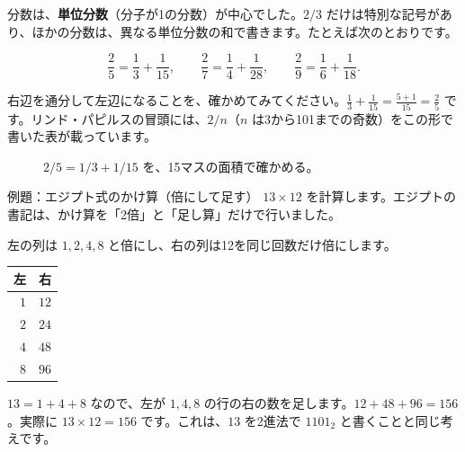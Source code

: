 \documentclass[a4paper,11pt,openany]{ltjsbook}
\begin{document}
分数は、\textbf{単位分数}（分子が1の分数）が中心でした。$2/3$ だけは特別な記号があり、ほかの分数は、異なる単位分数の和で書きます。たとえば次のとおりです。

\[
\frac{2}{5}=\frac13+\frac1{15},\qquad \frac27=\frac14+\frac1{28},\qquad \frac29=\frac16+\frac1{18}.
\]

右辺を通分して左辺になることを、確かめてみてください。$\tfrac13+\tfrac1{15}=\tfrac{5+1}{15}=\tfrac{2}{5}$ です。リンド・パピルスの冒頭には、$2/n$（$n$ は3から101までの奇数）をこの形で書いた表が載っています。

\begin{figure}[htbp]
\centering
{}
\caption{$2/5=1/3+1/15$ を、15マスの面積で確かめる。}
\end{figure}

\begin{examplebox}{例題：エジプト式のかけ算（倍にして足す）}
$13\times 12$ を計算します。エジプトの書記は、かけ算を「2倍」と「足し算」だけで行いました。

左の列は $1,2,4,8$ と倍にし、右の列は12を同じ回数だけ倍にします。

\begin{center}
\begin{tabular}{rr}
\toprule
左 & 右\\
\midrule
$1$ & $12$\\
$2$ & $24$\\
$4$ & $48$\\
$8$ & $96$\\
\bottomrule
\end{tabular}
\end{center}

$13=1+4+8$ なので、左が $1,4,8$ の行の右の数を足します。$12+48+96=156$。実際に $13\times12=156$ です。これは、$13$ を2進法で $1101_2$ と書くことと同じ考えです。
\end{examplebox}
\end{document}
